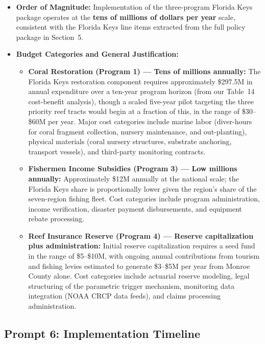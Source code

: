 \documentclass[10pt,letterpaper]{article}
\newcounter{metric}
\begin{document}
\begin{itemize}

    \item \textbf{Order of Magnitude:} Implementation of the three-program Florida Keys package operates at the \textbf{tens of millions of dollars per year} scale, consistent with the Florida Keys line items extracted from the full policy package in Section~5.

    \item \textbf{Budget Categories and General Justification:}
    \begin{itemize}
        \item \textbf{Coral Restoration (Program 1) --- Tens of millions annually:} The Florida Keys restoration component requires approximately \$297.5M in annual expenditure over a ten-year program horizon (from our Table~14 cost-benefit analysis), though a scaled five-year pilot targeting the three priority reef tracts would begin at a fraction of this, in the range of \$30--\$60M per year. Major cost categories include marine labor (diver-hours for coral fragment collection, nursery maintenance, and out-planting), physical materials (coral nursery structures, substrate anchoring, transport vessels), and third-party monitoring contracts.
        \item \textbf{Fishermen Income Subsidies (Program 3) --- Low millions annually:} Approximately \$12M annually at the national scale; the Florida Keys share is proportionally lower given the region's share of the seven-region fishing fleet. Cost categories include program administration, income verification, disaster payment disbursements, and equipment rebate processing.
        \item \textbf{Reef Insurance Reserve (Program 4) --- Reserve capitalization plus administration:} Initial reserve capitalization requires a seed fund in the range of \$5--\$10M, with ongoing annual contributions from tourism and fishing levies estimated to generate \$3--\$5M per year from Monroe County alone. Cost categories include actuarial reserve modeling, legal structuring of the parametric trigger mechanism, monitoring data integration (NOAA CRCP data feeds), and claims processing administration.
    \end{itemize}

\end{itemize}

\subsection*{Prompt 6: Implementation Timeline}
\end{document}
